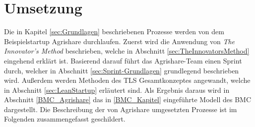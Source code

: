 \chapter{Umsetzung}
\label{sec:Umsetzung}
Die in Kapitel \ref{sec:Grundlagen} beschriebenen Prozesse werden von dem Beispielstartup Agrishare durchlaufen. Zuerst wird die Anwendung von \textit{The Innovator's Method} beschrieben, welche in Abschnitt \ref{sec:TheInnovatorsMethod} eingehend erklärt ist. Basierend darauf führt das Agrishare-Team einen Sprint durch, welcher in Abschnitt \ref{sec:Sprint-Grundlagen} grundlegend beschrieben wird. Außerdem werden Methoden des \ac{TLS} Gesamtkonzeptes angewandt, welche in Abschnitt \ref{sec:LeanStartup} erläutert sind. Als Ergebnis daraus wird in Abschnitt \ref{BMC_Agrishare} das in \ref{BMC_Kapitel} eingeführte Modell des \ac{BMC} dargestellt. Die Beschreibung der von Agrishare umgesetzten Prozesse ist im Folgenden zusammengefasst geschildert.



